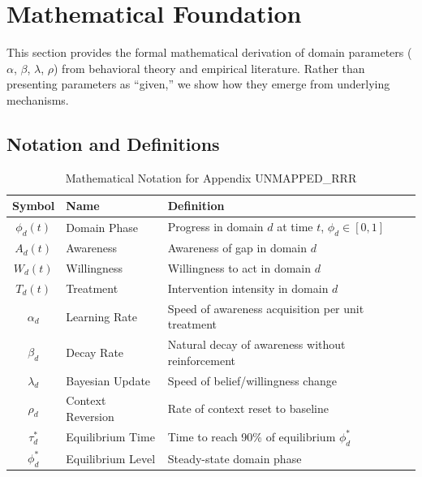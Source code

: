 \section{Mathematical Foundation}
\label{rrr:mathfoundation}

\begin{tcolorbox}[colback=blue!5!white, colframe=blue!75!black, title=Purpose]
This section provides the formal mathematical derivation of domain parameters
($\alpha$, $\beta$, $\lambda$, $\rho$) from behavioral theory and empirical literature.
Rather than presenting parameters as ``given,'' we show how they emerge from
underlying mechanisms.
\end{tcolorbox}

\subsection{Notation and Definitions}

\begin{table}[htbp]
\centering
\caption{Mathematical Notation for Appendix UNMAPPED_RRR}
\label{tab:rrr-notation}
\renewcommand{\arraystretch}{1.3}
\small
\begin{tabular}{@{}clp{6cm}@{}}
\toprule
\textbf{Symbol} & \textbf{Name} & \textbf{Definition} \\
\midrule
$\phi_d(t)$ & Domain Phase & Progress in domain $d$ at time $t$, $\phi_d \in [0,1]$ \\
$A_d(t)$ & Awareness & Awareness of gap in domain $d$ \\
$W_d(t)$ & Willingness & Willingness to act in domain $d$ \\
$T_d(t)$ & Treatment & Intervention intensity in domain $d$ \\
$\alpha_d$ & Learning Rate & Speed of awareness acquisition per unit treatment \\
$\beta_d$ & Decay Rate & Natural decay of awareness without reinforcement \\
$\lambda_d$ & Bayesian Update & Speed of belief/willingness change \\
$\rho_d$ & Context Reversion & Rate of context reset to baseline \\
$\tau_d^*$ & Equilibrium Time & Time to reach 90\% of equilibrium $\phi_d^*$ \\
$\phi_d^*$ & Equilibrium Level & Steady-state domain phase \\
\bottomrule
\end{tabular}
\end{table}

